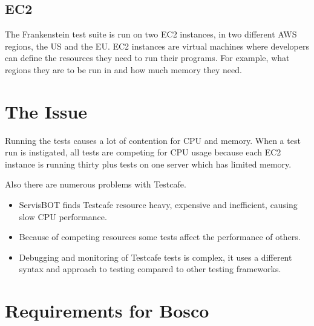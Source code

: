 \documentclass[12pt,a4paper,titlepage]{report}
\begin{document}
\subsection{EC2}
The Frankenstein test suite is run on two \ac{EC2} instances, in two different \ac{AWS} regions, the US and the EU. 
EC2 instances are virtual machines where developers can define the resources they need to run their programs. For example, what regions they are to be run in and how much memory they need. 
\section{The Issue}
Running the tests causes a lot of contention for \ac{CPU} and memory. 
When a test run is instigated, all tests are competing for CPU usage because each EC2 instance is running thirty plus tests on one server which has limited memory.

Also there are numerous problems with Testcafe. 
\begin{itemize}
 \item ServisBOT finds Testcafe resource heavy, expensive and inefficient, causing slow CPU performance. 
 \item Because of competing resources some tests affect the performance of others. 
 \item Debugging and monitoring of Testcafe tests is complex, it uses a different syntax and approach to testing compared to other testing frameworks.
\end{itemize}

\section{Requirements for Bosco}
\end{document}
